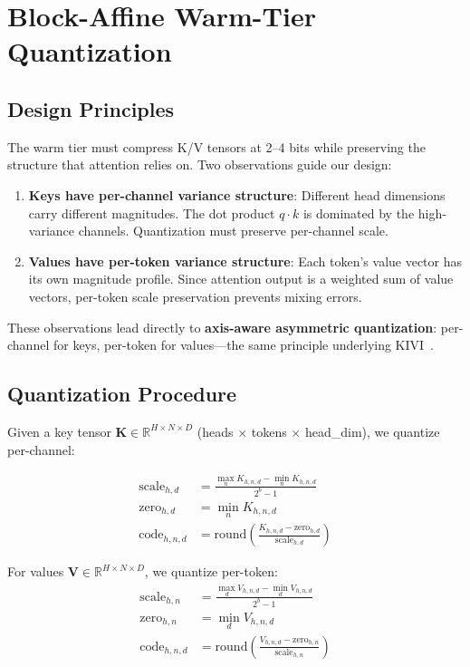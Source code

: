 \documentclass[11pt,a4paper]{article}
\begin{document}
\section{Block-Affine Warm-Tier Quantization}
\label{sec:quantizer}

\subsection{Design Principles}

The warm tier must compress K/V tensors at 2--4 bits while preserving the structure that attention relies on. Two observations guide our design:

\begin{enumerate}
    \item \textbf{Keys have per-channel variance structure}: Different head dimensions carry different magnitudes. The dot product $q \cdot k$ is dominated by the high-variance channels. Quantization must preserve per-channel scale.
    \item \textbf{Values have per-token variance structure}: Each token's value vector has its own magnitude profile. Since attention output is a weighted sum of value vectors, per-token scale preservation prevents mixing errors.
\end{enumerate}

These observations lead directly to \textbf{axis-aware asymmetric quantization}: per-channel for keys, per-token for values---the same principle underlying KIVI~\cite{kivi}.

\subsection{Quantization Procedure}

Given a key tensor $\mathbf{K} \in \mathbb{R}^{H \times N \times D}$ (heads $\times$ tokens $\times$ head\_dim), we quantize per-channel:

\begin{align}
    \text{scale}_{h,d} &= \frac{\max_n K_{h,n,d} - \min_n K_{h,n,d}}{2^b - 1} \\
    \text{zero}_{h,d} &= \min_n K_{h,n,d} \\
    \text{code}_{h,n,d} &= \text{round}\left(\frac{K_{h,n,d} - \text{zero}_{h,d}}{\text{scale}_{h,d}}\right)
\end{align}

For values $\mathbf{V} \in \mathbb{R}^{H \times N \times D}$, we quantize per-token:
\begin{align}
    \text{scale}_{h,n} &= \frac{\max_d V_{h,n,d} - \min_d V_{h,n,d}}{2^b - 1} \\
    \text{zero}_{h,n} &= \min_d V_{h,n,d} \\
    \text{code}_{h,n,d} &= \text{round}\left(\frac{V_{h,n,d} - \text{zero}_{h,n}}{\text{scale}_{h,n}}\right)
\end{align}
\end{document}
